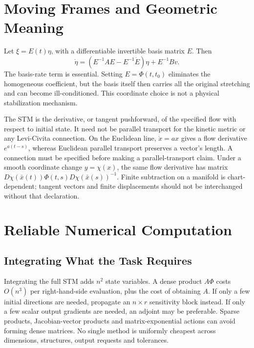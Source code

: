 \section{Moving Frames and Geometric Meaning}

Let $\xi=E(t)\eta$, with a differentiable invertible basis matrix $E$. Then
\begin{equation}
\dot\eta=\left(E^{-1}AE-E^{-1}\dot E\right)\eta+E^{-1}Bv.
\end{equation}
The basis-rate term is essential. Setting $E=\Phi(t,t_0)$ eliminates the homogeneous coefficient, but the basis itself then carries all the original stretching and can become ill-conditioned. This coordinate choice is not a physical stabilization mechanism.

The STM is the derivative, or tangent pushforward, of the specified flow with respect to initial state. It need not be parallel transport for the kinetic metric or any Levi-Civita connection. On the Euclidean line, $\dot x=ax$ gives a flow derivative $e^{a(t-s)}$, whereas Euclidean parallel transport preserves a vector's length. A connection must be specified before making a parallel-transport claim. Under a smooth coordinate change $y=\chi(x)$, the same flow derivative has matrix $D\chi(\bar x(t))\Phi(t,s)D\chi(\bar x(s))^{-1}$. Finite subtraction on a manifold is chart-dependent; tangent vectors and finite displacements should not be interchanged without that declaration.

\section{Reliable Numerical Computation}
\label{sec:ch2:numerical-stm}

\subsection{Integrating What the Task Requires}

Integrating the full STM adds $n^2$ state variables. A dense product $A\Phi$ costs $O(n^3)$ per right-hand-side evaluation, plus the cost of obtaining $A$. If only a few initial directions are needed, propagate an $n\times r$ sensitivity block instead. If only a few scalar output gradients are needed, an adjoint may be preferable. Sparse products, Jacobian-vector products and matrix-exponential actions can avoid forming dense matrices. No single method is uniformly cheapest across dimensions, structures, output requests and tolerances.

